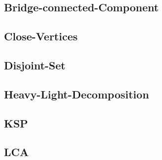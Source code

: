 \documentclass[a4paper,10pt,twocolumn,oneside]{article}
\begin{document}
\subsection{Bridge-connected-Component}


\subsection{Close-Vertices}


%

\subsection{Disjoint-Set}


%

\subsection{Heavy-Light-Decomposition}


\subsection{KSP}


\subsection{LCA}


%

%
\end{document}
